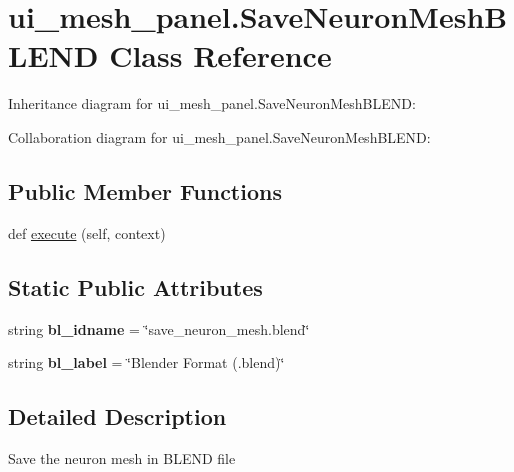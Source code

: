 \hypertarget{classui__mesh__panel_1_1SaveNeuronMeshBLEND}{}\section{ui\+\_\+mesh\+\_\+panel.\+Save\+Neuron\+Mesh\+B\+L\+E\+ND Class Reference}
\label{classui__mesh__panel_1_1SaveNeuronMeshBLEND}


Inheritance diagram for ui\+\_\+mesh\+\_\+panel.\+Save\+Neuron\+Mesh\+B\+L\+E\+ND\+:


Collaboration diagram for ui\+\_\+mesh\+\_\+panel.\+Save\+Neuron\+Mesh\+B\+L\+E\+ND\+:
\subsection*{Public Member Functions}
\begin{DoxyCompactItemize}
\item 
def \hyperlink{classui__mesh__panel_1_1SaveNeuronMeshBLEND_a255efb4204849eed06827e4d73c9fd66}{execute} (self, context)
\end{DoxyCompactItemize}
\subsection*{Static Public Attributes}
\begin{DoxyCompactItemize}
\item 
string {\bfseries bl\+\_\+idname} = \char`\"{}save\+\_\+neuron\+\_\+mesh.\+blend\char`\"{}\hypertarget{classui__mesh__panel_1_1SaveNeuronMeshBLEND_a53f27d7c52ee4b2f88435c255b433d44}{}\label{classui__mesh__panel_1_1SaveNeuronMeshBLEND_a53f27d7c52ee4b2f88435c255b433d44}

\item 
string {\bfseries bl\+\_\+label} = \char`\"{}Blender Format (.blend)\char`\"{}\hypertarget{classui__mesh__panel_1_1SaveNeuronMeshBLEND_a5b98e94af8a5ce700d0df9cb5e715c71}{}\label{classui__mesh__panel_1_1SaveNeuronMeshBLEND_a5b98e94af8a5ce700d0df9cb5e715c71}

\end{DoxyCompactItemize}


\subsection{Detailed Description}
\begin{DoxyVerb}Save the neuron mesh in BLEND file\end{DoxyVerb}
 

